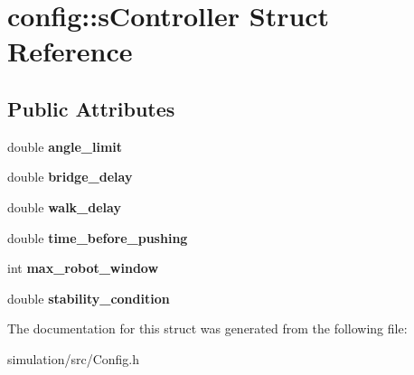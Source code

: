 \hypertarget{structconfig_1_1s_controller}{}\section{config\+:\+:s\+Controller Struct Reference}
\label{structconfig_1_1s_controller}
\subsection*{Public Attributes}
\begin{DoxyCompactItemize}
\item 
\mbox{\label{structconfig_1_1s_controller_a8923acd9bfb67b8e9e3c1c3c8dbec683}} 
double {\bfseries angle\+\_\+limit}
\item 
\mbox{\label{structconfig_1_1s_controller_a2fde08fbf75929ab52e5e23cee7cc221}} 
double {\bfseries bridge\+\_\+delay}
\item 
\mbox{\label{structconfig_1_1s_controller_ae6375847a7a00925fb89b9410b37ce1f}} 
double {\bfseries walk\+\_\+delay}
\item 
\mbox{\label{structconfig_1_1s_controller_af54d74a54e118e607b93f0cda27d4898}} 
double {\bfseries time\+\_\+before\+\_\+pushing}
\item 
\mbox{\label{structconfig_1_1s_controller_a945185f0421baea5a8d447e75ec78b38}} 
int {\bfseries max\+\_\+robot\+\_\+window}
\item 
\mbox{\label{structconfig_1_1s_controller_ad6caeeebb6d554e790a62a3d6939d853}} 
double {\bfseries stability\+\_\+condition}
\end{DoxyCompactItemize}


The documentation for this struct was generated from the following file\+:\begin{DoxyCompactItemize}
\item 
simulation/src/Config.\+h\end{DoxyCompactItemize}
